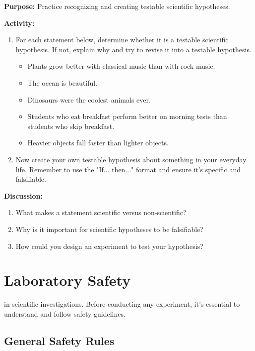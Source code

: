 \documentclass[justified,notoc]{tufte-book}
\newenvironment{investigation}[1]{%
    \begin{tcolorbox}[colback=info!10,colframe=info,title=\textbf{Investigation: #1}]
}{%
    \end{tcolorbox}
}
\begin{document}
\begin{investigation}{Creating Testable Hypotheses}
\textbf{Purpose:} Practice recognizing and creating testable scientific hypotheses.

\textbf{Activity:}
\begin{enumerate}
    \item For each statement below, determine whether it is a testable scientific hypothesis. If not, explain why and try to revise it into a testable hypothesis.
    
    \begin{itemize}
        \item Plants grow better with classical music than with rock music.
        \item The ocean is beautiful.
        \item Dinosaurs were the coolest animals ever.
        \item Students who eat breakfast perform better on morning tests than students who skip breakfast.
        \item Heavier objects fall faster than lighter objects.
    \end{itemize}
    
    \item Now create your own testable hypothesis about something in your everyday life. Remember to use the "If... then..." format and ensure it's specific and falsifiable.
\end{enumerate}

\textbf{Discussion:}
\begin{enumerate}
    \item What makes a statement scientific versus non-scientific?
    \item Why is it important for scientific hypotheses to be falsifiable?
    \item How could you design an experiment to test your hypothesis?
\end{enumerate}
\end{investigation}

\section{Laboratory Safety}

 in scientific investigations. Before conducting any experiment, it's essential to understand and follow safety guidelines.

\subsection{General Safety Rules}
\end{document}
